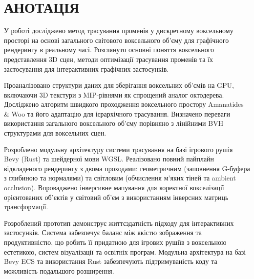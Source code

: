 \chapter*{АНОТАЦІЯ}

У роботі досліджено метод трасування променів у дискретному воксельному просторі на основі загального світового воксельного об'єму для графічного рендерингу в реальному часі. Розглянуто основні поняття воксельного представлення 3D сцен, методи оптимізації трасування променів та їх застосування для інтерактивних графічних застосунків.

Проаналізовано структури даних для зберігання воксельних об'ємів на GPU, включаючи 3D текстури з MIP-рівнями як спрощений аналог октодерева. Досліджено алгоритм швидкого проходження воксельного простору Amanatides \& Woo та його адаптацію для ієрархічного трасування. Визначено переваги використання загального воксельного об'єму порівняно з лінійними BVH структурами для воксельних сцен.

Розроблено модульну архітектуру системи трасування на базі ігрового рушія Bevy (Rust) та шейдерної мови WGSL. Реалізовано повний пайплайн відкладеного рендерингу з двома проходами: геометричним (заповнення G-буфера з глибиною та нормалями) та світловим (обчислення м'яких тіней та ambient occlusion). Впроваджено інверсивне мапування для коректної вокселізації орієнтованих об'єктів у світовий об'єм з використанням інверсних матриць трансформації.

Розроблений прототип демонструє життєздатність підходу для інтерактивних застосунків. Система забезпечує баланс між якістю зображення та продуктивністю, що робить її придатною для ігрових рушіїв з воксельною естетикою, систем візуалізації та освітніх програм. Модульна архітектура на базі Bevy ECS та використання Rust забезпечують підтримуваність коду та можливість подальшого розширення.

